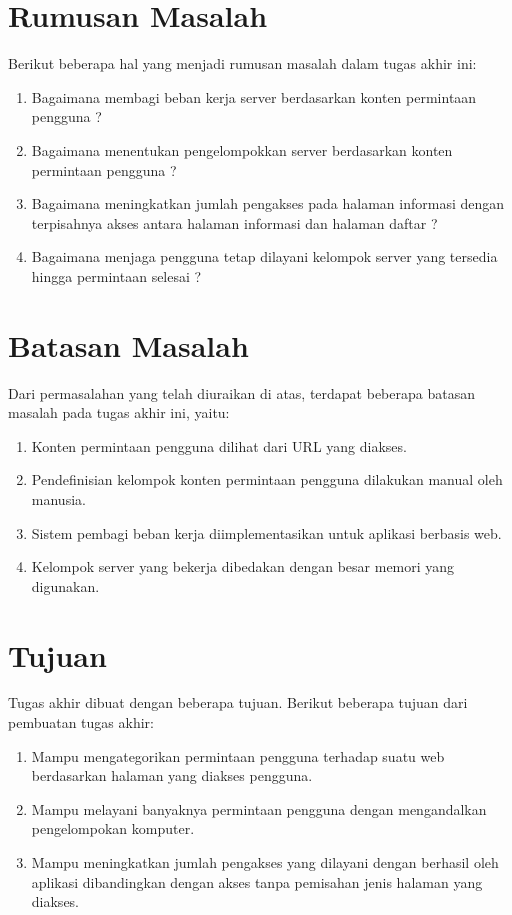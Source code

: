 \documentclass{ta-its}
\begin{document}
        \section{Rumusan Masalah}
	Berikut beberapa hal yang menjadi rumusan masalah dalam tugas akhir ini:
	\begin{enumerate}
	\item Bagaimana membagi beban kerja server berdasarkan konten permintaan pengguna ?
	\item Bagaimana menentukan pengelompokkan server berdasarkan konten permintaan pengguna ?
	\item Bagaimana meningkatkan jumlah pengakses pada halaman informasi dengan terpisahnya akses antara halaman informasi dan halaman daftar ?
	\item Bagaimana menjaga pengguna tetap dilayani kelompok server yang tersedia hingga permintaan selesai ?
	\end{enumerate}

        \section{Batasan Masalah}
	Dari permasalahan yang telah diuraikan di atas, terdapat beberapa batasan masalah pada tugas akhir ini, yaitu:
	\begin{enumerate}
	\item Konten permintaan pengguna dilihat dari URL yang diakses.
	\item Pendefinisian kelompok konten permintaan pengguna dilakukan manual oleh manusia.
	\item Sistem pembagi beban kerja diimplementasikan untuk aplikasi berbasis web.
	\item Kelompok server yang bekerja dibedakan dengan besar memori yang digunakan.
	\end{enumerate}

        \section{Tujuan}
	Tugas akhir dibuat dengan beberapa tujuan. Berikut beberapa tujuan dari pembuatan tugas akhir:
	\begin{enumerate}
	\item Mampu mengategorikan permintaan pengguna terhadap suatu web berdasarkan halaman yang diakses pengguna.
	\item Mampu melayani banyaknya permintaan pengguna dengan mengandalkan pengelompokan komputer.
	\item Mampu meningkatkan jumlah pengakses yang dilayani dengan berhasil oleh aplikasi dibandingkan dengan akses tanpa pemisahan jenis halaman yang diakses.
	\end{enumerate}
\end{document}

